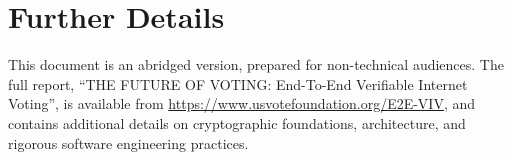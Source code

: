 \chapter{Further Details}
\label{chapter:crypto_spec}
\label{chapter:architecture}
\label{cha:rigor-softw-engin}

This document is an abridged version, prepared for non-technical audiences.
The full report, ``THE FUTURE OF VOTING: End-To-End Verifiable Internet
Voting'', is available from \url{https://www.usvotefoundation.org/E2E-VIV},
and contains additional details on cryptographic foundations, architecture,
and rigorous software engineering practices.
